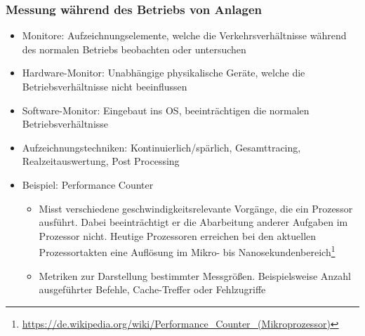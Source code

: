 \subsubsection{Messung während des Betriebs von Anlagen}
\begin{itemize}
	\item Monitore: Aufzeichnungselemente, welche die Verkehrsverhältnisse während des normalen Betriebs beobachten oder untersuchen
	\item Hardware-Monitor: Unabhängige physikalische Geräte, welche die Betriebsverhältnisse nicht beeinflussen
	\item Software-Monitor: Eingebaut ins OS, beeinträchtigen die normalen Betriebsverhältnisse
	\item Aufzeichnungstechniken: Kontinuierlich/spärlich, Gesamttracing, Realzeitauswertung, Post Processing 
	\item Beispiel: Performance Counter
	\begin{itemize}
		\item Misst verschiedene geschwindigkeitsrelevante Vorgänge, die ein Prozessor ausführt. Dabei beeinträchtigt er die Abarbeitung anderer Aufgaben im Prozessor nicht. Heutige Prozessoren erreichen bei den aktuellen Prozessortakten eine Auflösung im Mikro- bis Nanosekundenbereich\footnote{\url{https://de.wikipedia.org/wiki/Performance_Counter_(Mikroprozessor)}}
		\item Metriken zur Darstellung bestimmter Messgrößen. Beispielsweise Anzahl ausgeführter Befehle, Cache-Treffer oder Fehlzugriffe
	\end{itemize}
\end{itemize}

